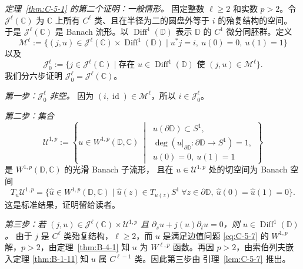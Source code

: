 \emph{定理~\ref{thm:C-5-1} 的第二个证明：一般情形。}
固定整数 $\ell\ge2$ 和实数 $p>2$。令 $\mathcal J^\ell(\mathbb C)$ 为
$\mathbb C$ 上所有 $C^\ell$ 类、且在半径为二的圆盘外等于 $i$ 的殆复结构的空间。
于是 $\mathcal J^\ell(\mathbb C)$ 是 Banach 流形。以
$\operatorname{Diff}^1(\mathbb D)$ 表示 $\mathbb D$ 的 $C^1$ 微分同胚群。定义
\[
  \mathcal M^\ell:=
  \{(j,u)\in\mathcal J^\ell(\mathbb C)
     \times\operatorname{Diff}^1(\mathbb D)
       \mid u^*j=i,\ u(0)=0,\ u(1)=1\}
\]
以及
\[
  \mathcal J^\ell_0:=
  \{j\in\mathcal J^\ell(\mathbb C)
    \mid\text{存在 }u\in\operatorname{Diff}^1(\mathbb D)
           \text{ 使 }(j,u)\in\mathcal M^\ell\}.
\]
我们分六步证明 $\mathcal J^\ell_0=\mathcal J^\ell(\mathbb C)$。

\emph{第一步：$\mathcal J^\ell_0$ 非空。}
因为 $(i,\operatorname{id})\in\mathcal M^\ell$，所以
$i\in\mathcal J^\ell_0$。

\emph{第二步：集合}
\[
  \mathcal U^{1,p}:=
  \left\{u\in W^{1,p}(\mathbb D,\mathbb C)\ \middle|\
    \begin{array}{l}
      u(\partial\mathbb D)\subset S^1,\\
      \deg(u|_{\partial\mathbb D}:\partial\mathbb D\to S^1)=1,\\
      u(0)=0,\ u(1)=1
    \end{array}\right\}
\]
是 $W^{1,p}(\mathbb D,\mathbb C)$ 的光滑 Banach 子流形，
且在 $u\in\mathcal U^{1,p}$ 处的切空间为 Banach 空间
\[
  T_u\mathcal U^{1,p}=
  \{\hat u\in W^{1,p}(\mathbb D,\mathbb C)
     \mid\hat u(z)\in T_{u(z)}S^1\ \forall z\in\partial\mathbb D,
     \ \hat u(0)=\hat u(1)=0\}.
\]
这是标准结果，证明留给读者。

\emph{第三步：若 $(j,u)\in\mathcal J^\ell(\mathbb C)\times\mathcal U^{1,p}$
且 $\partial_su+j(u)\partial_tu=0$，则
$u\in\operatorname{Diff}^1(\mathbb D)$。}
由于 $j$ 是 $C^\ell$ 类殆复结构，$\ell\ge2$，而 $u$ 是满足边值问题
\eqref{eq:C-5-7} 的 $W^{1,p}$ 解，$p>2$，由定理~\ref{thm:B-4-1}
知 $u$ 为 $W^{\ell,p}$ 函数。再因 $p>2$，由索伯列夫嵌入定理
\ref{thm:B-1-11} 知 $u$ 属 $C^{\ell-1}$ 类。因此第三步由
引理~\ref{lem:C-5-7} 推出。

